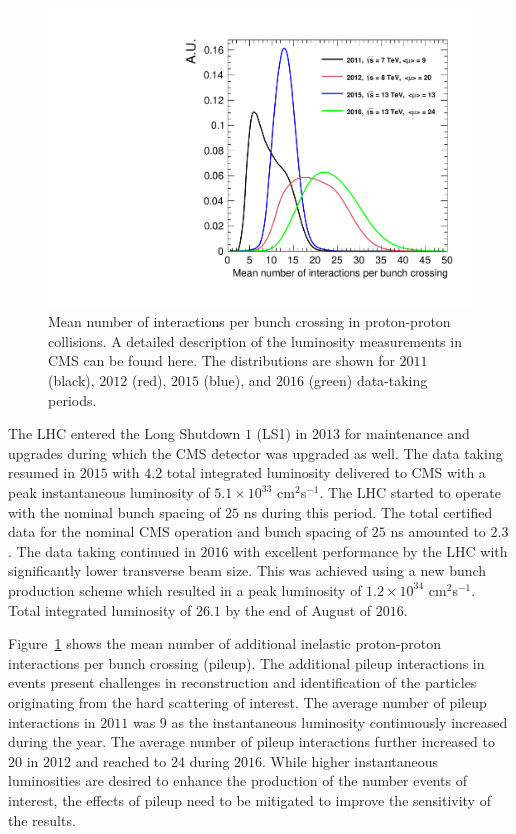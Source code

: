  \begin{figure}[h]
\centering
\includegraphics[width=0.60\columnwidth]{figures_chapter2/pileup_cms}
\caption{Mean number of interactions per bunch crossing in proton-proton collisions. A detailed description of the  luminosity measurements in CMS can be found here\cite{CMS-PAS-LUM-12-001,CMS-PAS-LUM-13-001,CMS-PAS-LUM-15-001}. The distributions are shown for $2011$ (black), $2012$ (red), $2015$ (blue), and $2016$ (green) data-taking periods.}
\label{fig:pu}
\end{figure} 

The LHC entered the Long Shutdown $1$ (LS1) in $2013$ for maintenance and upgrades during which the CMS detector was upgraded as well. The data taking resumed in $2015$ with $4.2$ \ifb total integrated luminosity delivered to CMS with a peak instantaneous luminosity of $5.1 \times 10^{33}$ cm$^2$s$^{-1}$. The LHC started to operate with the nominal bunch spacing of $25$ ns during this period. The total certified data for the nominal CMS operation and bunch spacing of $25$ ns amounted to $2.3$ \ifb. The data taking continued in $2016$ with excellent performance by the LHC with significantly lower transverse beam size. This was achieved using a new bunch production scheme which resulted in a peak luminosity of  $1.2 \times 10^{34}$ cm$^2$s$^{-1}$. Total integrated luminosity of $26.1$ \ifb by the end of August of $2016$.   

Figure~\ref{fig:pu} shows the mean number of additional inelastic proton-proton interactions per bunch crossing (pileup). The additional pileup interactions in events present challenges in reconstruction and identification of the particles originating from the hard scattering of interest. The average number of pileup interactions in $2011$ was $9$ as the instantaneous luminosity continuously increased during the year. The average number of pileup interactions further increased to $20$ in $2012$ and reached to $24$ during $2016$.  While higher instantaneous luminosities are desired to enhance the production of the number events of interest, the effects of pileup need to be mitigated to improve the sensitivity of the results. 



